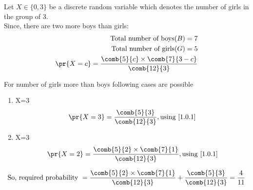 Let $X \in \{0,3\}$ be a discrete random variable which denotes the number of girls in the group of 3.\\ 
Since, there are two more boys than girls:\\
\begin{align}
    \text{Total number of boys} (B) = 7  \notag \\
    \text{Total number of girls} (G) = 5  \notag\\
    \pr{X=c}=\frac{\comb{5}{c}\times \comb{7}{3-c}}{\comb{12}{3}} \label{1.0.1}
\end{align}
\begin{table}[h]
\caption{Probabilities of each case }    \label{tab:my_label}
\end{table}

For number of girls more than boys following cases are possible
\begin{enumerate}
    \item X=3
    \begin{align}
        \pr{X=3} = \frac{\comb{5}{3}}{\comb{12}{3}}, \text{using \eqref{1.0.1}} \notag
    \end{align}
    \item X=3
    \begin{align}
        \pr{X=2} = \frac{\comb{5}{2}\times\comb{7}{1}}{\comb{12}{3}}, \text{using \eqref{1.0.1}} \notag
    \end{align}
\end{enumerate}
\begin{align}
   \text {So, required probability }=  \frac{\comb{5}{2}\times\comb{7}{1}}{\comb{12}{3}} + \frac{\comb{5}{3}}{\comb{12}{3}} = \frac{4}{11} \notag
\end{align}